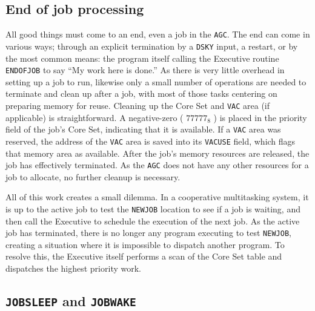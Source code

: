 \documentclass[refcap, oxford]{ahsan}
\begin{document}
\subsection{End of job processing}
All good things must come to an end, even a job in the \texttt{AGC}. The end can come in various ways; through an explicit termination by a \texttt{DSKY} input, a restart, or by the most common means: the program itself calling the Executive routine \texttt{ENDOFJOB} to say ``My work here is done.'' As there is very little overhead in setting up a job to run, likewise only a small number of operations are needed to terminate and clean up after a job, with most of those tasks centering on preparing memory for reuse. Cleaning up the Core Set and \texttt{VAC} area (if applicable) is straightforward. A negative-zero ( $77777_{8}$ ) is placed in the priority field of the job's Core Set, indicating that it is available. If a \texttt{VAC} area was reserved, the address of the \texttt{VAC} area is saved into its \texttt{VACUSE} field, which flags that memory area as available. After the job's memory resources are released, the job has effectively terminated. As the \texttt{AGC} does not have any other resources for a job to allocate, no further cleanup is necessary.

All of this work creates a small dilemma. In a cooperative multitasking system, it is up to the active job to test the \texttt{NEWJOB} location to see if a job is waiting, and then call the Executive to schedule the execution of the next job. As the active job has terminated, there is no longer any program executing to test \texttt{NEWJOB}, creating a situation where it is impossible to dispatch another program. To resolve this, the Executive itself performs a scan of the Core Set table and dispatches the highest priority work.


\subsection{\texttt{JOBSLEEP} and \texttt{JOBWAKE}}
\end{document}
